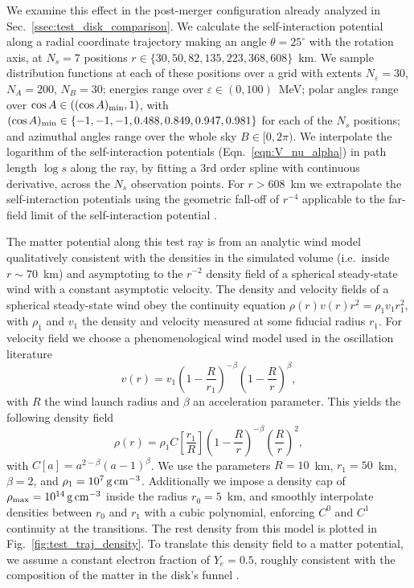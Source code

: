 \documentclass[aps,floatfix,prd,superscriptaddress,twocolumn]{revtex4-1}
\begin{document}
We examine this effect in the post-merger configuration already analyzed
in Sec.~\ref{ssec:test_disk_comparison}.
We calculate the self-interaction potential along a radial coordinate trajectory
making an angle $\theta=25^\circ$ with the rotation axis,
at $N_s=7$ positions $r\in\{30,50,82,135,223,368,608\}$~km.
We sample distribution functions at each of these positions over a grid
with extents $N_\varepsilon=30$, $N_A=200$, $N_B=30$;
energies range over $\varepsilon\in(0,100)$~MeV;
polar angles range over $\cos A \in ((\cos A)_{\rm min}, 1)$, with
$(\cos A)_{\rm min}\in\{-1,-1,-1,0.488,0.849,0.947,0.981\}$
for each of the $N_s$ positions;
and azimuthal angles range over the whole sky $B\in[0,2\pi)$.
We interpolate the logarithm of the self-interaction potentials
(Eqn.~\ref{eqn:V_nu_alpha})
in path length $\log s$ along the ray,
by fitting a 3rd order spline with continuous derivative,
across the $N_s$ observation points.
For $r>608$~km we extrapolate the self-interaction potentials using the
geometric fall-off of $r^{-4}$ applicable to the far-field limit of the
self-interaction potential \cite{malk2016-mnr_3}.

The matter potential along this test ray is from an analytic wind
model qualitatively consistent with the densities in the
simulated volume (i.e.\ inside $r\sim70$~km) and asymptoting to the $r^{-2}$
density field of a spherical steady-state wind with a constant asymptotic
velocity.
The density and velocity fields of a spherical steady-state wind
obey the continuity equation $\rho(r)v(r)r^2=\rho_1 v_1 r_1^2$,
with $\rho_1$ and $v_1$ the density and velocity measured at some fiducial
radius $r_1$.
For velocity field we choose a phenomenological wind model used in the
oscillation literature \cite{surm2005-nu_and_grb_outflows}
\begin{equation}
  v(r) = v_1 \left(1-\frac{R}{r_1}\right)^{-\beta}
  \left(1-\frac{R}{r}\right)^{\beta},
\end{equation}
with $R$ the wind launch radius and $\beta$ an acceleration parameter.
This yields the following density field
\begin{equation}
  \rho(r)=\rho_1 C\left[\frac{r_1}{R}\right]
  \left(1-\frac{R}{r}\right)^{-\beta}\left(\frac{R}{r}\right)^2,
\end{equation}
with $C[a]=a^{2-\beta}(a-1)^\beta$.
We use the parameters $R=10$~km, $r_1=50$~km, $\beta=2$,
and $\rho_1=10^7\,{\rm g}\,{\rm cm}^{-3}$.
Additionally we impose a density cap of
$\rho_{\rm max}=10^{14}\,{\rm g}\,{\rm cm}^{-3}$ inside the radius $r_0=5$~km,
and smoothly interpolate densities between $r_0$ and $r_1$ with a cubic polynomial,
enforcing $C^0$ and $C^1$ continuity at the transitions.
The rest density from this model is plotted in Fig.~\ref{fig:test_traj_density}.
To translate this density field to a matter potential, we assume a constant
electron fraction of $Y_e=0.5$, roughly consistent with the composition of the
matter in the disk's funnel \cite[Fig.~8]{fouc2016-m1_evolve_n}.
\end{document}
